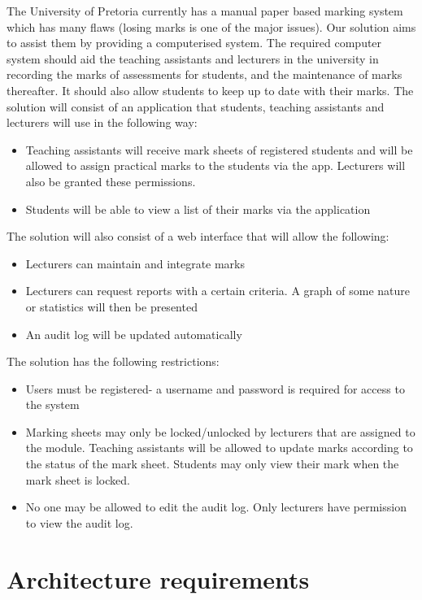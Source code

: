 \documentclass[12pt]{article}
\begin{document}
		\vspace{0.2in}
		 The University of Pretoria currently has a manual paper based marking system which has many flaws (losing marks is one of the major issues). Our solution aims to assist them by providing a computerised system. The required computer system should aid the teaching assistants and lecturers in the university in recording the marks of assessments for students, and the maintenance of marks thereafter. It should also allow students to keep up to date with their marks. 
			The solution will consist of an application that students, teaching assistants and lecturers will use in the following way:
			\begin{itemize}
						\item Teaching assistants will receive mark sheets of registered students and will be allowed to assign practical marks to the students via the app. Lecturers will also be granted these permissions.
						\item Students will be able to view a list of their marks via the application
			\end{itemize}			
			The solution will also consist of a web interface that will allow the following:
			\begin{itemize}
						\item Lecturers can maintain and integrate marks
						\item Lecturers can request reports with a certain criteria. A graph of some nature or statistics will then be presented 
						\item An audit log will be updated automatically 
			\end{itemize}
			The solution has the following restrictions:
			\begin{itemize}
						\item Users must be registered- a username and password is required for access to the system
						\item Marking sheets may only be locked/unlocked by lecturers that are assigned to the module. Teaching assistants will be allowed to update marks according to the status of the mark sheet. Students may only view their mark when the mark sheet is locked. 
						\item No one may be allowed to edit the audit log. Only lecturers have permission to view the audit log. 
			\end{itemize}
			
		
	
	\section{Architecture requirements}
	
\end{document}
